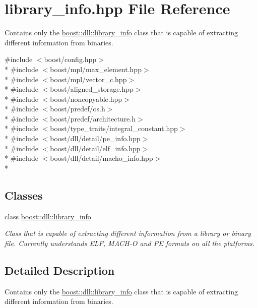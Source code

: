 \hypertarget{a00593}{}\section{library\+\_\+info.\+hpp File Reference}
\label{a00593}


Contains only the \hyperlink{a00192}{boost\+::dll\+::library\+\_\+info} class that is capable of extracting different information from binaries.  


{\ttfamily \#include $<$boost/config.\+hpp$>$}\\*
{\ttfamily \#include $<$boost/mpl/max\+\_\+element.\+hpp$>$}\\*
{\ttfamily \#include $<$boost/mpl/vector\+\_\+c.\+hpp$>$}\\*
{\ttfamily \#include $<$boost/aligned\+\_\+storage.\+hpp$>$}\\*
{\ttfamily \#include $<$boost/noncopyable.\+hpp$>$}\\*
{\ttfamily \#include $<$boost/predef/os.\+h$>$}\\*
{\ttfamily \#include $<$boost/predef/architecture.\+h$>$}\\*
{\ttfamily \#include $<$boost/type\+\_\+traits/integral\+\_\+constant.\+hpp$>$}\\*
{\ttfamily \#include $<$boost/dll/detail/pe\+\_\+info.\+hpp$>$}\\*
{\ttfamily \#include $<$boost/dll/detail/elf\+\_\+info.\+hpp$>$}\\*
{\ttfamily \#include $<$boost/dll/detail/macho\+\_\+info.\+hpp$>$}\\*
\subsection*{Classes}
\begin{DoxyCompactItemize}
\item 
class \hyperlink{a00192}{boost\+::dll\+::library\+\_\+info}
\begin{DoxyCompactList}\small\item\em Class that is capable of extracting different information from a library or binary file. Currently understands E\+LF, M\+A\+C\+H-\/O and PE formats on all the platforms. \end{DoxyCompactList}\end{DoxyCompactItemize}


\subsection{Detailed Description}
Contains only the \hyperlink{a00192}{boost\+::dll\+::library\+\_\+info} class that is capable of extracting different information from binaries. 

